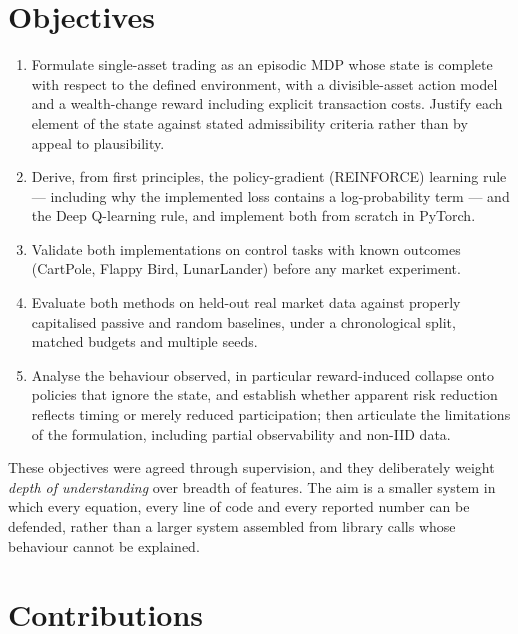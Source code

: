 \section{Objectives}
\label{sec:intro_objectives}

\begin{enumerate}
  \item[\textbf{O1}] Formulate single-asset trading as an episodic MDP
        whose state is complete with respect to the defined environment,
        with a divisible-asset action model and a wealth-change reward
        including explicit transaction costs. Justify each element of
        the state against stated admissibility criteria rather than by
        appeal to plausibility.
  \item[\textbf{O2}] Derive, from first principles, the policy-gradient
        (REINFORCE) learning rule --- including why the implemented loss
        contains a log-probability term --- and the Deep Q-learning rule,
        and implement both from scratch in PyTorch.
  \item[\textbf{O3}] Validate both implementations on control tasks with
        known outcomes (CartPole, Flappy Bird, LunarLander) before any
        market experiment.
  \item[\textbf{O4}] Evaluate both methods on held-out real market data
        against properly capitalised passive and random baselines, under
        a chronological split, matched budgets and multiple seeds.
  \item[\textbf{O5}] Analyse the behaviour observed, in particular
        reward-induced collapse onto policies that ignore the state, and
        establish whether apparent risk reduction reflects timing or merely
        reduced participation; then articulate the limitations of the
        formulation, including partial observability and non-IID data.
\end{enumerate}

These objectives were agreed through supervision, and they deliberately
weight \emph{depth of understanding} over breadth of features. The aim is
a smaller system in which every equation, every line of code and every
reported number can be defended, rather than a larger system assembled
from library calls whose behaviour cannot be explained.

\section{Contributions}
\label{sec:intro_contributions}

